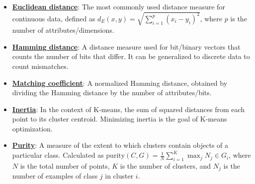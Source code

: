 \documentclass{article}%
\begin{document}
\begin{itemize}[leftmargin=*]
\item \href{https://purdue.brightspace.com/d2l/common/assets/pdfjs-d2l-dist/1.0.14-legacy/web/viewer.html?file=\%2Fcontent\%2Fenforced\%2F1095467-wl.202510.CS.24300.001\%2F12L2-distance-clusters.pdf\%3Fou\%3D1095467\&lang=en-us\&container=d2l-fileviewer-rendered-pdf\&fullscreen=d2l-fileviewer-rendered-pdf-dialog\&height=667#page=17}{\textbf{Euclidean distance}}: The most commonly used distance measure for continuous data, defined as $d_E(x, y) = \sqrt{\sum_{i=1}^p (x_i - y_i)^2}$, where $p$ is the number of attributes/dimensions.%
\item \href{https://purdue.brightspace.com/d2l/common/assets/pdfjs-d2l-dist/1.0.14-legacy/web/viewer.html?file=\%2Fcontent\%2Fenforced\%2F1095467-wl.202510.CS.24300.001\%2F12L2-distance-clusters.pdf\%3Fou\%3D1095467\&lang=en-us\&container=d2l-fileviewer-rendered-pdf\&fullscreen=d2l-fileviewer-rendered-pdf-dialog\&height=667#page=19}{\textbf{Hamming distance}}: A distance measure used for bit/binary vectors that counts the number of bits that differ. It can be generalized to discrete data to count mismatches.%
\item \href{https://purdue.brightspace.com/d2l/common/assets/pdfjs-d2l-dist/1.0.14-legacy/web/viewer.html?file=\%2Fcontent\%2Fenforced\%2F1095467-wl.202510.CS.24300.001\%2F12L2-distance-clusters.pdf\%3Fou\%3D1095467\&lang=en-us\&container=d2l-fileviewer-rendered-pdf\&fullscreen=d2l-fileviewer-rendered-pdf-dialog\&height=667#page=19}{\textbf{Matching coefficient}}: A normalized Hamming distance, obtained by dividing the Hamming distance by the number of attributes/bits.%
\item \href{https://purdue.brightspace.com/d2l/common/assets/pdfjs-d2l-dist/1.0.14-legacy/web/viewer.html?file=\%2Fcontent\%2Fenforced\%2F1095467-wl.202510.CS.24300.001\%2F12L2-distance-clusters.pdf\%3Fou\%3D1095467\&lang=en-us\&container=d2l-fileviewer-rendered-pdf\&fullscreen=d2l-fileviewer-rendered-pdf-dialog\&height=667#page=33}{\textbf{Inertia}}: In the context of K-means, the sum of squared distances from each point to its cluster centroid. Minimizing inertia is the goal of K-means optimization.%
\item \href{https://purdue.brightspace.com/d2l/common/assets/pdfjs-d2l-dist/1.0.14-legacy/web/viewer.html?file=\%2Fcontent\%2Fenforced\%2F1095467-wl.202510.CS.24300.001\%2F12L2-distance-clusters.pdf\%3Fou\%3D1095467\&lang=en-us\&container=d2l-fileviewer-rendered-pdf\&fullscreen=d2l-fileviewer-rendered-pdf-dialog\&height=667#page=44}{\textbf{Purity}}: A measure of the extent to which clusters contain objects of a particular class. Calculated as $\text{purity}(C, G) = \frac{1}{N} \sum_{i=1}^K \max_j N_j \in G_i$, where $N$ is the total number of points, $K$ is the number of clusters, and $N_j$ is the number of examples of class $j$ in cluster $i$.%
\end{itemize}
\end{document}
